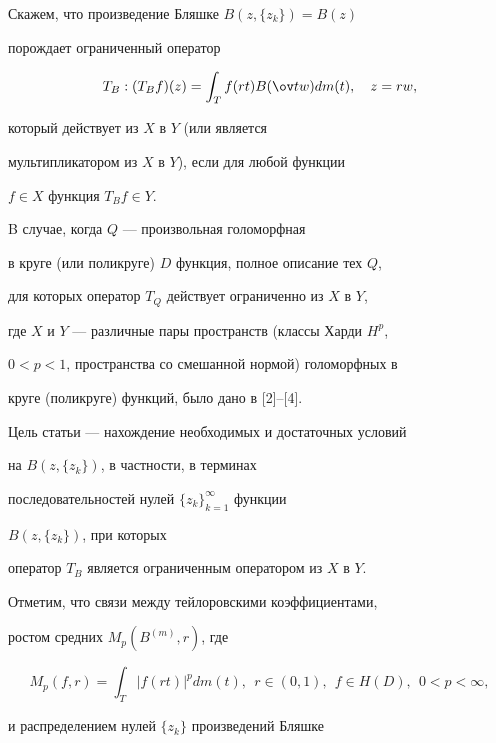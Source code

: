 \begin{defnnonum} 


Скажем, что произведение Бляшке $B(z,\{z_k\})=B(z)$ 


порождает ограниченный оператор 


$$ 


T_B:(T_B f)(z)=\int_T f(r t)B(\ov t w)d m(t),\quad z=r w, 


$$ 


который действует из $X$ в $Y$ (или является 


мультипликатором из $X$ в $Y$), если для любой функции 


$f\in X$ функция $T_B f\in Y$.





B случае, когда $Q$ --- произвольная голоморфная 


в круге (или поликруге) $D$ функция, полное описание тех $Q$, 


для которых оператор $T_Q$ действует ограниченно из $X$ в $Y$, 


где $X$ и $Y$ --- различные пары пространств (классы Харди $H^p$, 


$0<p<1$, пространства со смешанной нормой) голоморфных в 


круге (поликруге) функций, было дано в [2]--[4]. 





Цель статьи --- нахождение необходимых и достаточных условий 


на $B(z,\{z_k\})$, в частности, в терминах 


последовательностей нулей $\{z_k\}^\infty_{k=1}$ функции 


$B(z,\{z_k\})$, при которых 


оператор $T_B$ является ограниченным оператором из $X$ в $Y$. 


\end{defnnonum} 


 


Отметим, что связи между тейлоровскими коэффициентами, 


ростом средних $M_p(B^{(m)},r)$, где


$$


M_p(f,r)=\displaystyle\int_T |f(r 


t)|^p d m(t),\ \ r\in(0,1),\ \ f\in H(D),\ \ 0<p<\infty,


$$


и распределением нулей $\{z_k\}$ произведений Бляшке 


